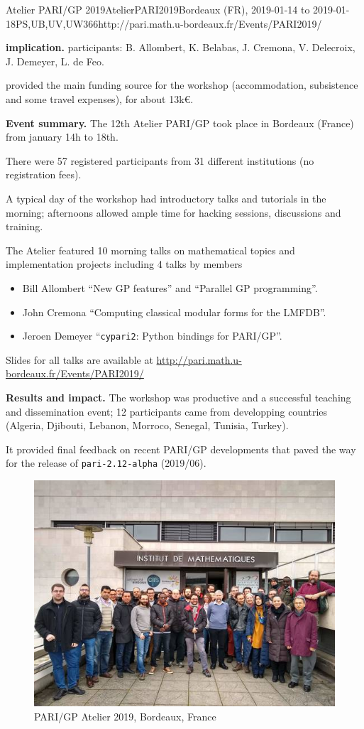 \begin{event}{Atelier PARI/GP 2019}{AtelierPARI2019}{Bordeaux (FR),
2019-01-14 to 2019-01-18}{PS,UB,UV,UW}{36}{6}{http://pari.math.u-bordeaux.fr/Events/PARI2019/}


\textbf{\ODK implication.} \ODK participants: B. Allombert, K. Belabas, J.
Cremona, V. Delecroix, J.  Demeyer, L. de Feo.

\ODK provided the main funding source for the workshop (accommodation,
subsistence and some travel expenses), for about 13k\euro.

\textbf{Event summary.} The 12th Atelier PARI/GP took place in Bordeaux
(France) from january 14h to 18th.

There were 57 registered participants from 31 different institutions
(no registration fees).

A typical day of the workshop had introductory talks and tutorials
in the morning; afternoons allowed ample time for hacking sessions,
discussions and training.

The Atelier featured 10 morning talks on mathematical topics and
implementation projects including 4 talks by \ODK members
\begin{itemize}
\item Bill Allombert ``New GP features'' and ``Parallel GP programming''.
\item John Cremona ``Computing classical modular forms for the LMFDB''.
\item Jeroen Demeyer ``\texttt{cypari2}: Python bindings for PARI/GP''.
\end{itemize}

Slides for all talks are available at
\url{http://pari.math.u-bordeaux.fr/Events/PARI2019/}

\textbf{Results and impact.} The workshop was productive and a successful
teaching and dissemination event; 12 participants came from developping
countries (Algeria, Djibouti, Lebanon, Morroco, Senegal, Tunisia,
Turkey).

It provided final feedback on recent PARI/GP developments that paved the way
for the release of \texttt{pari-2.12-alpha} (2019/06).

\begin{figure}[ht]
  \includegraphics[width=.75\textwidth]{pari2019.jpg}
  \caption*{PARI/GP Atelier 2019, Bordeaux, France}
\end{figure}

\end{event}
